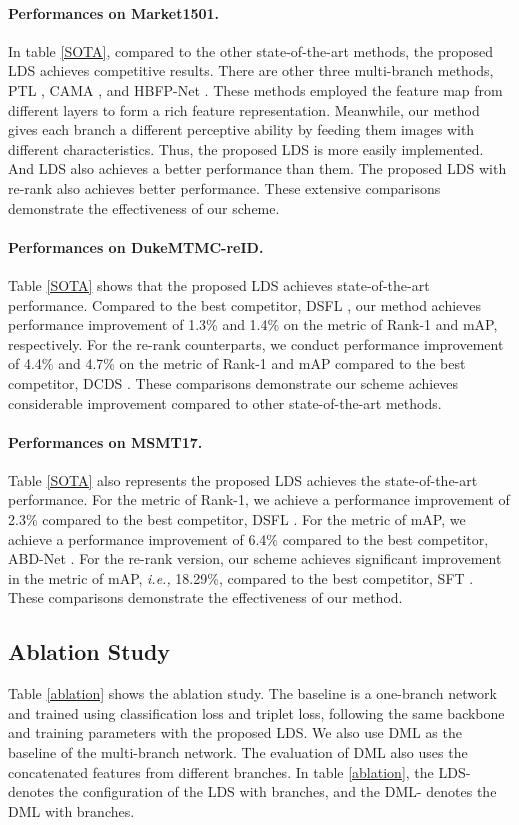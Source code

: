 \documentclass[a4paper]{cas-dc}
\begin{document}
\paragraph{Performances on Market1501.}
In table \ref{SOTA}, compared to the other state-of-the-art methods, the proposed LDS achieves competitive results. There are other three multi-branch methods, PTL \cite{RN491}, CAMA \cite{RN514}, and HBFP-Net \cite{RN513}. These methods employed the feature map from different layers to form a rich feature representation. Meanwhile, our method gives each branch a different perceptive ability by feeding them images with different characteristics. Thus, the proposed LDS is more easily implemented. And LDS also achieves a better performance than them. The proposed LDS with re-rank also achieves better performance. These extensive comparisons demonstrate the effectiveness of our scheme.

\paragraph{Performances on DukeMTMC-reID.}
Table \ref{SOTA} shows that the proposed LDS achieves state-of-the-art performance. Compared to the best competitor, DSFL \cite{RN482}, our method achieves performance improvement of 1.3\% and 1.4\% on the metric of Rank-1 and mAP, respectively. For the re-rank counterparts, we conduct performance improvement of 4.4\% and 4.7\% on the metric of Rank-1 and mAP compared to the best competitor, DCDS \cite{RN450}. These comparisons demonstrate our scheme achieves considerable improvement compared to other state-of-the-art methods.

\paragraph{Performances on MSMT17.}
Table \ref{SOTA} also represents the proposed LDS achieves the state-of-the-art performance. For the metric of Rank-1, we achieve a performance improvement of 2.3\% compared to the best competitor, DSFL \cite{RN482}. For the metric of mAP, we achieve a performance improvement of 6.4\% compared to the best competitor, ABD-Net \cite{RN407}. For the re-rank version, our scheme achieves significant improvement in the metric of mAP, \textit{i.e.,} 18.29\%, compared to the best competitor, SFT \cite{RN457}. These comparisons demonstrate the effectiveness of our method.

\subsection{Ablation Study}
Table \ref{ablation} shows the ablation study. The baseline is a one-branch network and trained using classification loss and triplet loss, following the same backbone and training parameters with the proposed LDS. We also use DML \cite{RN187} as the baseline of the multi-branch network. The evaluation of DML also uses the concatenated features from different branches. In table \ref{ablation}, the LDS- denotes the  configuration of the LDS with  branches, and the DML- denotes the DML with  branches.
\end{document}
